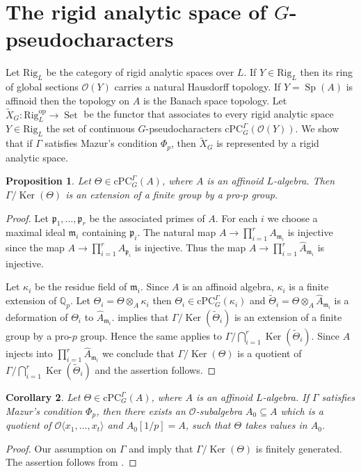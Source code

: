 \documentclass{amsart}
\newtheorem{prop}{Proposition}[section]
\newtheorem{cor}[prop]{Corollary}
\theoremstyle{definition}
\theoremstyle{remark}
\DeclareMathOperator{\Ker}{Ker}
\DeclareMathOperator{\Sp}{Sp}
\DeclareMathOperator{\Set}{Set}
\newcommand{\Qp}{\mathbb {Q}_p}
\newcommand{\mm}{\mathfrak m}
\newcommand{\OO}{\mathcal O}
\newcommand{\pp}{\mathfrak p}
\newcommand{\cPC}{\mathrm{cPC}}
\newcommand{\Rig}{\mathrm{Rig}}
\newcommand{\op}{\mathrm{op}}
\newcommand{\wTheta}{\widetilde{\Theta}}
\begin{document}
\section{The rigid analytic space of $G$-pseudocharacters}
Let $\Rig_L$ be the category of rigid analytic spaces over $L$. 
If $Y\in \Rig_L$ then its ring of global sections $\OO(Y)$ 
carries a natural Hausdorff topology. If $Y=\Sp(A)$ is affinoid then the topology on $A$ is the Banach space topology. 
 Let $\tilde{X}_G: \Rig_L^{\op} \rightarrow \Set$ be the functor that associates to every rigid analytic space $Y\in \Rig_L$ the 
set of continuous $G$-pseudocharacters $\cPC^{\Gamma}_G(\OO(Y ))$. We show that
if $\Gamma$ satisfies Mazur's condition $\Phi_p$, then $\tilde{X}_G$ is represented
by a rigid analytic space. 

\begin{prop}\label{sweet} Let $\Theta\in \cPC^{\Gamma}_G(A)$, where $A$ is an affinoid $L$-algebra.
Then $\Gamma/\Ker(\Theta)$ is an extension of a finite group by a pro-$p$ group.
\end{prop}
\begin{proof} Let $\pp_1, \ldots, \pp_r$ be the associated primes of $A$. For 
each $i$ 
we choose a maximal ideal $\mm_i$ containing $\pp_i$. The natural map 
$A\rightarrow \prod_{i=1}^r A_{\mm_i}$ is injective since the map 
$A\rightarrow \prod_{i=1}^r A_{\pp_i}$ is injective. Thus 
the map $A\rightarrow \prod_{i=1}^r \hat{A}_{\mm_i}$ is injective.

Let $\kappa_i$ be the residue field of $\mm_i$. Since $A$ is an affinoid algebra, 
$\kappa_i$ is a finite extension of $\Qp$. Let $\Theta_i=\Theta\otimes_A \kappa_i$ 
then $\Theta_i\in \cPC^{\Gamma}_G(\kappa_i)$ and $\wTheta_i=\Theta\otimes_A \hat{A}_{\mm_i}$
is a deformation of $\Theta_i$ to $\hat{A}_{\mm_i}$. 
implies that $\Gamma/\Ker(\wTheta_i)$ is an extension of  a finite group
by a pro-$p$ group. Hence the same applies to $\Gamma/\bigcap_{i=1}^r \Ker(\wTheta_i)$.
Since $A$ injects into $\prod_{i=1}^r \hat{A}_{\mm_i}$ we conclude
that $\Gamma/\Ker(\Theta)$ is a quotient of $\Gamma/\bigcap_{i=1}^r \Ker(\wTheta_i)$
and the assertion follows.
\end{proof}

\begin{cor} Let $\Theta\in \cPC^{\Gamma}_G(A)$, where $A$ is an affinoid $L$-algebra.
If $\Gamma$ satisfies Mazur's condition $\Phi_p$, then 
there exists an  $\OO$-subalgebra $A_0 \subseteq A$ which is a quotient of $\OO \langle x_1, \dots, x_t \rangle$ and $A_0[1/p] = A$, such that $\Theta$ takes values in $A_0$.
\end{cor}
\begin{proof} Our assumption on $\Gamma$ and  imply that 
$\Gamma/\Ker(\Theta)$ is finitely generated. The assertion follows from 
\cite[Lemma 6.16 (2)]{quast}.
\end{proof}
\end{document}
